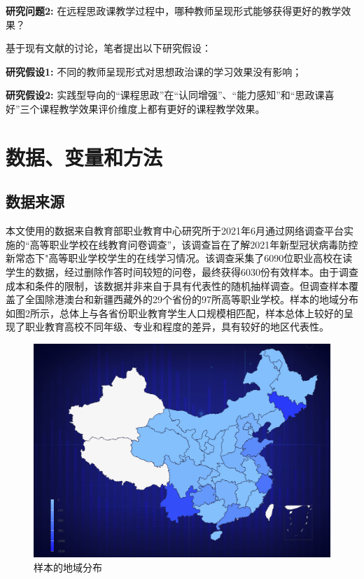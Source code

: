 \documentclass[
  12pt,
]{ctexart}
\begin{document}
\textbf{研究问题2:} 在远程思政课教学过程中，哪种教师呈现形式能够获得更好的教学效果？

基于现有文献的讨论，笔者提出以下研究假设：

\textbf{研究假设1:} 不同的教师呈现形式对思想政治课的学习效果没有影响；

\textbf{研究假设2:} 实践型导向的``课程思政''在``认同增强''、``能力感知''和``思政课喜好''三个课程教学效果评价维度上都有更好的课程教学效果。

\hypertarget{ux6570ux636eux53d8ux91cfux548cux65b9ux6cd5}{%
\section{数据、变量和方法}\label{ux6570ux636eux53d8ux91cfux548cux65b9ux6cd5}}

\hypertarget{ux6570ux636eux6765ux6e90}{%
\subsection{数据来源}\label{ux6570ux636eux6765ux6e90}}

本文使用的数据来自教育部职业教育中心研究所于2021年6月通过网络调查平台实施的``高等职业学校在线教育问卷调查''，该调查旨在了解2021年新型冠状病毒防控新常态下"高等职业学校学生的在线学习情况。该调查采集了6090位职业高校在读学生的数据，经过删除作答时间较短的问卷，最终获得6030份有效样本。由于调查成本和条件的限制，该数据并非来自于具有代表性的随机抽样调查。但调查样本覆盖了全国除港澳台和新疆西藏外的29个省份的97所高等职业学校。样本的地域分布如图2所示，总体上与各省份职业教育学生人口规模相匹配，样本总体上较好的呈现了职业教育高校不同年级、专业和程度的差异，具有较好的地区代表性。

\begin{figure}[h]

{\centering \includegraphics[width=0.9\linewidth]{../figures/figure2} 

}

\caption{样本的地域分布}\label{fig:unnamed-chunk-2}
\end{figure}
\end{document}
